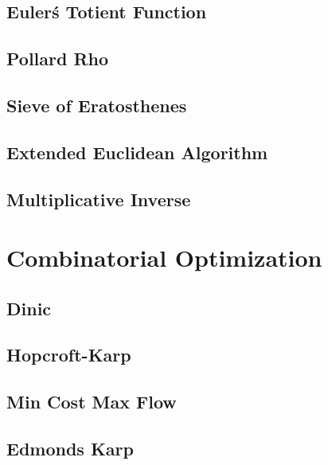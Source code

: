 \subsection{Euler\'s Totient Function}
\raggedbottom
\hrulefill
\subsection{Pollard Rho}
\raggedbottom
\hrulefill
\subsection{Sieve of Eratosthenes}
\raggedbottom
\hrulefill
\subsection{Extended Euclidean Algorithm}
\raggedbottom
\hrulefill
\subsection{Multiplicative Inverse}
\raggedbottom
\hrulefill

\section{Combinatorial Optimization}
\subsection{Dinic}
\raggedbottom
\hrulefill
\subsection{Hopcroft-Karp}
\raggedbottom
\hrulefill
\subsection{Min Cost Max Flow}
\raggedbottom
\hrulefill
\subsection{Edmonds Karp}
\raggedbottom
\hrulefill

